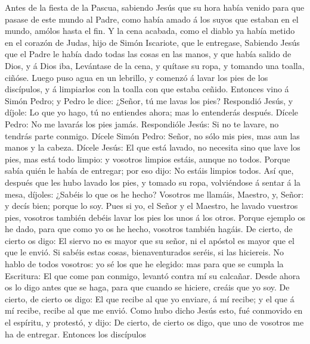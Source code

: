  Antes de la fiesta de la Pascua, sabiendo Jesús que su
hora había venido para que pasase de este mundo al Padre, como había
amado á los suyos que estaban en el mundo, amólos hasta el fin.
 Y la cena acabada, como el diablo ya había metido en el
corazón de Judas, hijo de Simón Iscariote, que le entregase,
 Sabiendo Jesús que el Padre le había dado todas las cosas
en las manos, y que había salido de Dios, y á Dios iba, 
Levántase de la cena, y quítase su ropa, y tomando una toalla, ciñóse.
 Luego puso agua en un lebrillo, y comenzó á lavar los
pies de los discípulos, y á limpiarlos con la toalla con que estaba
ceñido.  Entonces vino á Simón Pedro; y Pedro le dice:
¿Señor, tú me lavas los pies?  Respondió Jesús, y díjole:
Lo que yo hago, tú no entiendes ahora; mas lo entenderás después.
 Dícele Pedro: No me lavarás los pies jamás. Respondióle
Jesús: Si no te lavare, no tendrás parte conmigo.  Dícele
Simón Pedro: Señor, no sólo mis pies, mas aun las manos y la cabeza.
 Dícele Jesús: El que está lavado, no necesita sino que
lave los pies, mas está todo limpio: y vosotros limpios estáis, aunque
no todos.  Porque sabía quién le había de entregar; por
eso dijo: No estáis limpios todos.  Así que, después que
les hubo lavado los pies, y tomado su ropa, volviéndose á sentar á la
mesa, díjoles: ¿Sabéis lo que os he hecho?  Vosotros me
llamáis, Maestro, y, Señor: y decís bien; porque lo soy. 
Pues si yo, el Señor y el Maestro, he lavado vuestros pies, vosotros
también debéis lavar los pies los unos á los otros. 
Porque ejemplo os he dado, para que como yo os he hecho, vosotros
también hagáis.  De cierto, de cierto os digo: El siervo
no es mayor que su señor, ni el apóstol es mayor que el que le envió.
 Si sabéis estas cosas, bienaventurados seréis, si las
hiciereis.  No hablo de todos vosotros: yo sé los que he
elegido: mas para que se cumpla la Escritura: El que come pan conmigo,
levantó contra mí su calcañar.  Desde ahora os lo digo
antes que se haga, para que cuando se hiciere, creáis que yo soy.
 De cierto, de cierto os digo: El que recibe al que yo
enviare, á mí recibe; y el que á mí recibe, recibe al que me envió.
 Como hubo dicho Jesús esto, fué conmovido en el
espíritu, y protestó, y dijo: De cierto, de cierto os digo, que uno de
vosotros me ha de entregar.  Entonces los discípulos
